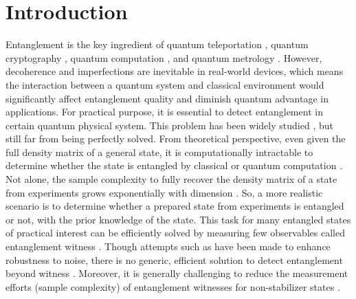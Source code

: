 \documentclass[
aps,
pra,
twocolumn,
floatfix,
]{revtex4-2}
\theoremstyle{plain}
\theoremstyle{definition}
\newcommand{\qi}[1]{\textcolor{blue}{(Qi: #1)}}
\begin{document}
\section{Introduction}
Entanglement \cite{horodeckiQuantumEntanglement2009} is the key ingredient of quantum teleportation \cite{bennettTeleportingUnknownQuantum1993}, quantum cryptography \cite{ekertQuantumCryptographyBased1991}, quantum computation \cite{briegelMeasurementbasedQuantumComputation2009}, and quantum metrology \cite{giovannettiQuantumenhancedMeasurementsBeating2004}.
However, decoherence and imperfections are inevitable in real-world devices, which means the interaction between a quantum system and classical environment would significantly affect entanglement quality and diminish quantum advantage in applications. 
For practical purpose, it is essential to detect entanglement in certain quantum physical system.
This problem has been widely studied \cite{guhneEntanglementDetection2009}, but still far from being perfectly solved. 
From theoretical perspective,
even given the full density matrix of a general state, it is computationally intractable to determine whether the state is entangled by classical \cite{gurvitsClassicalDeterministicComplexity2003} or quantum computation \cite{gutoskiQuantumInteractiveProofs2015}.
Not alone, the sample complexity to fully recover the density matrix of a state from experiments grows exponentially with dimension \cite{haahSampleoptimalTomographyQuantum2017,odonnellEfficientQuantumTomography2016}.
So, a more realistic scenario is to determine whether a prepared state from experiments is entangled or not,
with the prior knowledge of the state. 
This task for many entangled states of practical interest can be efficiently solved by measuring few observables called entanglement witness \cite{bourennaneWitnessingMultipartiteEntanglement2004,tothDetectingGenuineMultipartite2005,tothEntanglementDetectionStabilizer2005}.
Though attempts such as \cite{guhneNonlinearEntanglementWitnesses2006,zhouEntanglementDetectionCoherent2020} have been made to enhance robustness to noise, there is no generic, efficient solution to detect entanglement beyond witness \cite{weilenmannEntanglementDetectionMeasuring2020}.
Moreover, it is generally challenging to reduce the measurement efforts (sample complexity) of entanglement witnesses for non-stabilizer states \cite{zhangEfficientEntanglementGeneration2021}. 
\end{document}
